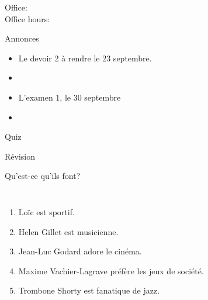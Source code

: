 \documentclass{beamer}
\subtitle[Nos loisirs]{Nos loisirs}
\begin{document}
  \begin{frame}
    \titlepage
    \tiny{Office: \\
          Office hours: }
  \end{frame}

  \begin{frame}{Annonces}
    \begin{itemize}
      \item Le devoir 2 à rendre le 23 septembre.
      \item[] 
      \item L'examen 1, le 30 septembre
      \item[] 
    \end{itemize}
  \end{frame}

  \begin{frame}{}
    \begin{center}
      \Large Quiz
    \end{center}
  \end{frame}

  \begin{frame}{Révision}
    \begin{center}
      
    \end{center}
  \end{frame}

  \begin{frame}{Qu'est-ce qu'ils font?}
    \begin{columns}
        \begin{enumerate}
          \item Loïc est sportif.
          \item<2-> Helen Gillet est musicienne.
          \item<3-> Jean-Luc Godard adore le cinéma.
          \item<4-> Maxime Vachier-Lagrave préfère les jeux de société.
          \item<5-> Trombone Shorty est fanatique de jazz.
        \end{enumerate}
        \begin{minipage}[c][0.6\textheight]{\linewidth}
          \begin{center}
          \end{center}
        \end{minipage}
    \end{columns}
  \end{frame}
\end{document}
